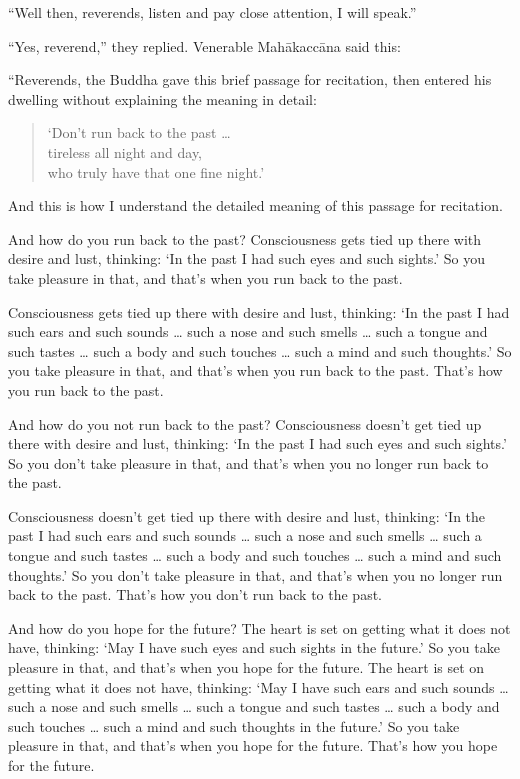 \documentclass[12pt,openany]{book}%
\begin{document}
“Well then, reverends, listen and pay close attention, I will speak.” 

“Yes, reverend,” they replied. Venerable \textsanskrit{Mahākaccāna} said this: 

“Reverends, the Buddha gave this brief passage for recitation, then entered his dwelling without explaining the meaning in detail: 

\begin{verse}%
‘Don’t run back to the past … \\
tireless all night and day, \\
who truly have that one fine night.’ 

%
\end{verse}

And this is how I understand the detailed meaning of this passage for recitation. 

And how do you run back to the past? Consciousness gets tied up there with desire and lust, thinking: ‘In the past I had such eyes and such sights.’ So you take pleasure in that, and that’s when you run back to the past. 

Consciousness gets tied up there with desire and lust, thinking: ‘In the past I had such ears and such sounds … such a nose and such smells … such a tongue and such tastes … such a body and such touches … such a mind and such thoughts.’ So you take pleasure in that, and that’s when you run back to the past. That’s how you run back to the past. 

And how do you not run back to the past? Consciousness doesn’t get tied up there with desire and lust, thinking: ‘In the past I had such eyes and such sights.’ So you don’t take pleasure in that, and that’s when you no longer run back to the past. 

Consciousness doesn’t get tied up there with desire and lust, thinking: ‘In the past I had such ears and such sounds … such a nose and such smells … such a tongue and such tastes … such a body and such touches … such a mind and such thoughts.’ So you don’t take pleasure in that, and that’s when you no longer run back to the past. That’s how you don’t run back to the past. 

And how do you hope for the future? The heart is set on getting what it does not have, thinking: ‘May I have such eyes and such sights in the future.’ So you take pleasure in that, and that’s when you hope for the future. The heart is set on getting what it does not have, thinking: ‘May I have such ears and such sounds … such a nose and such smells … such a tongue and such tastes … such a body and such touches … such a mind and such thoughts in the future.’ So you take pleasure in that, and that’s when you hope for the future. That’s how you hope for the future. 
\end{document}
